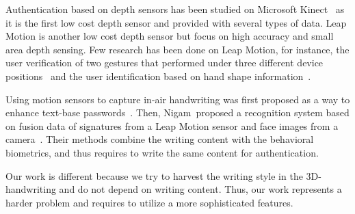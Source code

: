 

Authentication based on depth sensors has been studied on Microsoft Kinect~\cite{GaitKinectMS,Hayashi2014:WMU} as it is the first low cost depth sensor and provided with several types of data. Leap Motion is another low cost depth sensor but focus on high accuracy and small area depth sensing. Few research has been done on Leap Motion, for instance, the user verification of two gestures that performed under three different device positions~\cite{Aslan14:LeapMidAirGesture} and the user identification based on hand shape information~\cite{Bernardos2015:LeapHandIdentify}. 


Using motion sensors to capture in-air handwriting was first proposed as a way to enhance text-base passwords~\cite{TianQXW13:NDSS13}. Then, Nigam~\etal proposed a recognition system based on fusion data of signatures from a Leap Motion sensor and face images from a camera~\cite{Nigam15:LeapSigVeri}. Their methods combine the writing content with the behavioral biometrics, and thus requires to write the same content for authentication.  

Our work is different because we try to harvest the writing style in the 3D-handwriting and do not depend on writing content. Thus, our work represents a harder problem and requires to utilize a more sophisticated features. 

  

